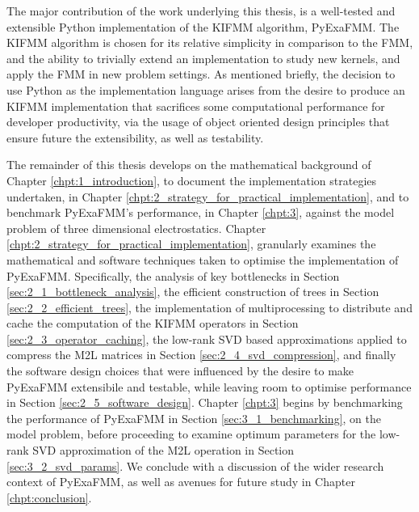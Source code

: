 The major contribution of the work underlying this thesis, is a well-tested and
extensible Python implementation of the \gls{KIFMM} algorithm, \gls{PyExaFMM}. The \gls{KIFMM}
algorithm is chosen for its relative simplicity in comparison to the \gls{FMM},
and the ability to trivially extend an implementation to study new kernels, and
apply the \gls{FMM} in new problem settings. As mentioned briefly,
the decision to use Python as the implementation language arises from the desire
to produce an \gls{KIFMM} implementation that sacrifices some computational
performance for developer productivity, via the usage of object oriented design
principles that ensure future the extensibility, as well as testability.

The remainder of this thesis develops on the mathematical background of Chapter
\ref{chpt:1_introduction}, to document the implementation strategies undertaken, in
Chapter \ref{chpt:2_strategy_for_practical_implementation}, and to benchmark
PyExaFMM's performance, in Chapter \ref{chpt:3}, against the model problem of
three dimensional electrostatics. Chapter \ref{chpt:2_strategy_for_practical_implementation}, granularly examines
the mathematical and software techniques taken to optimise the implementation of
\gls{PyExaFMM}. Specifically, the analysis of key bottlenecks in Section \ref{sec:2_1_bottleneck_analysis},
the efficient construction of trees in Section \ref{sec:2_2_efficient_trees}, the implementation
of multiprocessing to distribute and cache the computation of the \gls{KIFMM}
operators in Section \ref{sec:2_3_operator_caching}, the low-rank SVD based
approximations applied to compress the \gls{M2L} matrices in Section \ref{sec:2_4_svd_compression},
and finally the software design choices that were influenced by the desire to
make \gls{PyExaFMM} extensibile and testable, while leaving room to optimise
performance in Section \ref{sec:2_5_software_design}. Chapter \ref{chpt:3} begins
by benchmarking the performance of \gls{PyExaFMM} in Section \ref{sec:3_1_benchmarking},
on the model problem, before proceeding to examine optimum parameters for the
low-rank SVD approximation of the \gls{M2L} operation in Section \ref{sec:3_2_svd_params}.
We conclude with a discussion of the wider research context of \gls{PyExaFMM},
as well as avenues for future study in Chapter \ref{chpt:conclusion}.
